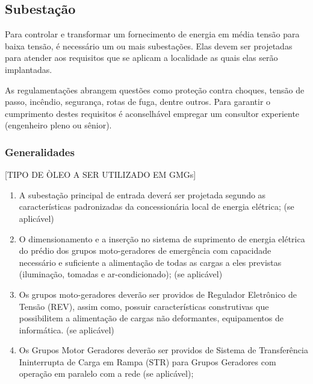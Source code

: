 \subsection{Subestação} \label{section: power plant}

Para controlar e transformar um fornecimento de energia em média tensão para baixa tensão, é necessário um ou mais subestações. Elas devem ser projetadas para atender aos requisitos que se aplicam a localidade as quais elas serão implantadas.

As regulamentações abrangem questões como proteção contra choques, tensão de passo, incêndio, segurança, rotas de fuga, dentre outros. Para garantir o cumprimento destes requisitos é aconselhável empregar um consultor experiente (engenheiro pleno ou sênior).

\subsubsection{Generalidades}

[TIPO DE ÒLEO A SER UTILIZADO EM GMGs]

\begin{enumerate}
	\item A subestação principal de entrada deverá ser projetada segundo as características padronizadas da concessionária local de energia elétrica; (se aplicável)
	
	\item O dimensionamento e a inserção no sistema de suprimento de energia elétrica do prédio dos grupos moto-geradores de emergência com capacidade necessário e suficiente a alimentação de todas as cargas a eles previstas (iluminação, tomadas e ar-condicionado); (se aplicável)
	
	\item Os grupos moto-geradores deverão ser providos de Regulador Eletrônico de Tensão (REV), assim como, possuir características construtivas que possibilitem a alimentação de cargas não deformantes, equipamentos de informática. (se aplicável)
	
	\item Os Grupos Motor Geradores deverão ser providos de Sistema de Transferência Ininterrupta de Carga em Rampa (STR) para Grupos Geradores com operação em paralelo com a rede (se aplicável);	
	
\end{enumerate}
